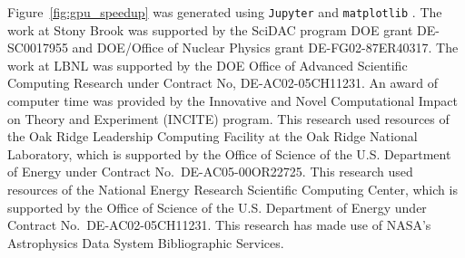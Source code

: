 \documentclass[a4paper]{jpconf}
\begin{document}

\ack Figure~\ref{fig:gpu_speedup} was generated using \texttt{Jupyter}
\citep{Kluyver2016} and \texttt{matplotlib} \citep{Hunter2007}.  The
work at Stony Brook was supported by the SciDAC program DOE grant
DE-SC0017955 and DOE/Office of Nuclear Physics grant
DE-FG02-87ER40317.  The work at LBNL was supported by the DOE Office
of Advanced Scientific Computing Research under Contract No,
DE-AC02-05CH11231.  An award of computer time was provided by the
Innovative and Novel Computational Impact on Theory and Experiment
(INCITE) program. This research used resources of the Oak Ridge
Leadership Computing Facility at the Oak Ridge National Laboratory,
which is supported by the Office of Science of the U.S. Department of
Energy under Contract No.\ DE-AC05-00OR22725.  This research used
resources of the National Energy Research Scientific Computing Center,
which is supported by the Office of Science of the U.S. Department of
Energy under Contract No.\ DE-AC02-05CH11231. This research has made
use of NASA's Astrophysics Data System Bibliographic Services.





\end{document}
